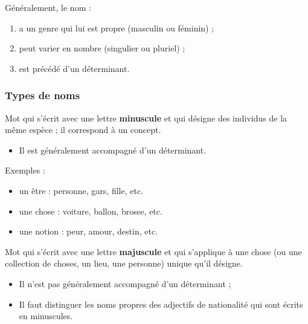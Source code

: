\documentclass[10pt, french]{article}
\begin{document}
\begin{multicols*}{2}
\begin{definitionNOHFILL}[Le nom]
Généralement, le nom : 
\begin{enumerate}
	\item	a un genre qui lui est propre (masculin ou féminin) ;
	\item	peut varier en nombre (singulier ou pluriel) ;
	\item	est précédé d'un déterminant.
\end{enumerate}
\end{definitionNOHFILL}

\subsubsection*{Types de noms}
\begin{definitionNOHFILLsub}
Mot qui s'écrit avec une lettre \textbf{minuscule} et qui désigne des individus de la même espèce ; il correspond à un concept.

\begin{itemize}
	\item	Il est généralement accompagné d'un déterminant.
\end{itemize}

\tcbline

Exemples :
\begin{itemize}
	\item	un être : personne, gars, fille, etc.
	\item	une chose : voiture, ballon, brosse, etc.
	\item	une notion : peur, amour, destin, etc.
\end{itemize}
\end{definitionNOHFILLsub}
\begin{definitionNOHFILLsub}
Mot qui s'écrit avec une lettre \textbf{majuscule} et qui s'applique à une chose (ou une collection de choses, un lieu, une personne) unique qu'il désigne.

\begin{itemize}
	\item	Il n'est pas généralement accompagné d'un déterminant ;
	\item	Il faut distinguer les noms propres des adjectifs de nationalité qui sont écrits en minuscules.
\end{itemize}

\tcbline


\end{definitionNOHFILLsub}
\end{multicols*}
\end{document}
